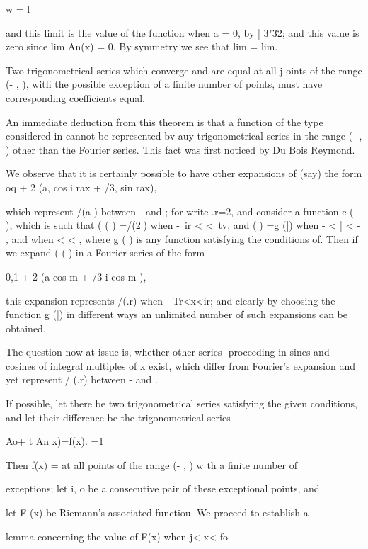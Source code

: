 {w = l

and this limit is the value of the function when a = 0, by | 3"32;
and this value is zero since lim An(x) = 0. By symmetry we see that
lim = lim.


Two trigonometrical series which converge and are equal at all j oints
of the range (- \pi, \pi), witli the possible exception of a finite
number of points, must have corresponding coefficients equal.

An immediate deduction from this theorem is that a function of the
type considered in cannot be represented bv auy trigonometrical
series in the range (- \pi, \pi) other than the Fourier series. This
fact was first noticed by Du Bois Reymond.

We observe that it is certainly possible to have other expansions of
(say) the form oq + 2 (a, cos i rax + /3, sin rax),

which represent /(a-) between - \pi and \pi; for write .r=2, and
consider a function c ( ), which is such that ( ( ) =/(2|) when -\ ir
< <\ tv, and (|) =g (|) when - \pi < | < - \pi, and when \pi < < \pi,
where g ( ) is any function satisfying the conditions of. Then
if we expand ( (|) in a Fourier series of the form

0,1 + 2 (a cos m + /3 i cos m ),

this expansion represents /(.r) when - Tr<x<ir; and clearly by
choosing the function g (|) in different ways an unlimited number of
such expansions can be obtained.

The question now at issue is, whether other series- proceeding in
sines and cosines of integral multiples of x exist, which differ from
Fourier's expansion and yet represent / (.r) between - \pi and \pi.

If possible, let there be two trigonometrical series satisfying the
given conditions, and let their difference be the trigonometrical
series

Ao+ t An x)=f(x). =1

Then f(x) = at all points of the range (- \pi, \pi) w th a finite number
of

exceptions; let i, o be a consecutive pair of these exceptional
points, and

let F (x) be Riemann's associated functiou. We proceed to establish a

lemma concerning the value of F(x) when j< x< fo-

}
